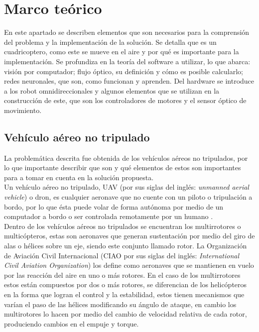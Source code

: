 \documentclass{iccmemoria}
\begin{document}
\chapter{Marco teórico}

En este apartado se describen elementos que son necesarios para la comprensión del problema y la implementación de la solución. Se detalla que es un cuadricoptero, como este se mueve en el aire y por qué es importante para la implementación. Se profundiza en la teoría del software a utilizar, lo que abarca: visión por computador; flujo óptico, su definición y cómo es posible calcularlo; redes neuronales, que son, como funcionan y aprenden. Del hardware se introduce a los robot omnidireccionales y algunos elementos que se utilizan en la construcción de este, que son los controladores de motores y el sensor óptico de movimiento.\\

\section{Vehículo aéreo no tripulado}

La problemática descrita fue obtenida de los vehículos aéreos no tripulados, por lo que importante describir que son y qué elementos de estos son importantes para a tomar en cuenta en la solución propuesta.\\

Un vehículo aéreo no tripulado, UAV (por sus siglas del inglés: \emph{unmanned aerial vehicle}) o dron, es cualquier aeronave que no cuente con un piloto o tripulación a bordo, por lo que ésta puede volar de forma autónoma por medio de un computador a bordo o ser controlada remotamente por un humano \cite{icao2011UAS}.\\

Dentro de los vehículos aéreos no tripulados se encuentran los multirrotores o multicópteros, estas son aeronaves que generan sustentación por medio del giro de alas o hélices sobre un eje, siendo este conjunto llamado rotor. La Organización de Aviación Civil Internacional (CIAO por sus siglas del inglés: \emph{International Civil Aviation Organization}) los define como aeronaves que se mantienen en vuelo por las reacción del aire en uno o más rotores. En el caso de los multirrotores estos están compuestos por dos o más rotores, se diferencian de los helicópteros en la forma que logran el control y la estabilidad, estos tienen mecanismos que varían el paso de las hélices modificando su ángulo de ataque, en cambio los multirotores lo hacen por medio del cambio de velocidad relativa de cada rotor, produciendo cambios en el empuje y torque.\\
\end{document}
